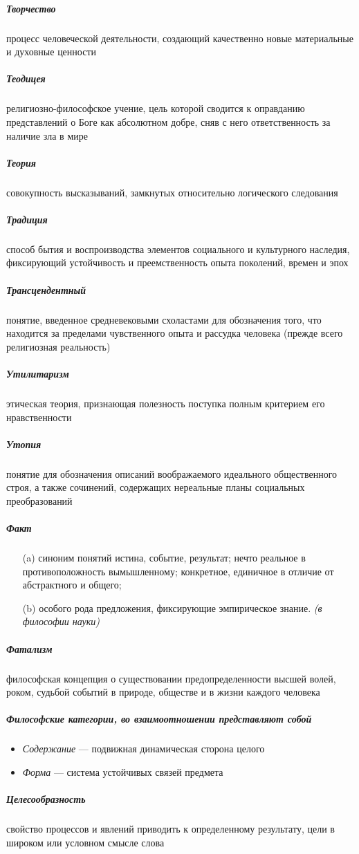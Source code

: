\documentclass[a4paper, 12pt]{article}
\theoremstyle{plain} %
\theoremstyle{definition} %
\theoremstyle{remark} %
\begin{document}
\subparagraph{Творчество}
	процесс человеческой деятельности, создающий качественно новые материальные и духовные ценности

\subparagraph{Теодицея}
	религиозно-философское учение, цель которой сводится к оправданию представлений о Боге как абсолютном добре, сняв с него ответственность за наличие зла в мире

\subparagraph{Теория}
	совокупность высказываний, замкнутых относительно логического следования


\subparagraph{Традиция}
	способ бытия и воспроизводства элементов социального и культурного наследия, фиксирующий устойчивость и преемственность опыта поколений, времен и эпох

\subparagraph{Трансцендентный}
	понятие, введенное средневековыми схоластами для обозначения того, что находится за пределами чувственного опыта и рассудка человека (прежде всего религиозная реальность)

\subparagraph{Утилитаризм}
	этическая теория, признающая полезность поступка полным критерием его нравственности

\subparagraph{Утопия}
	понятие для обозначения описаний воображаемого идеального общественного строя, а также сочинений, содержащих нереальные планы социальных преобразований

\subparagraph{Факт}
\begin{itemize}
	\item[(a)]  синоним понятий истина, событие, результат; нечто реальное в противоположность вымышленному; конкретное, единичное в отличие от абстрактного и общего;
	\item[(b)] особого рода предложения, фиксирующие эмпирическое знание. \emph{(в философии науки)}
\end{itemize}

\subparagraph{Фатализм}
	философская концепция о существовании предопределенности высшей волей, роком, судьбой событий в природе, обществе и в жизни каждого человека

\subparagraph{Философские категории, во взаимоотношении представляют собой}
\begin{itemize}
	\item \emph{Содержание} --- подвижная динамическая сторона целого
	\item \emph{Форма} ---  система устойчивых связей предмета
\end{itemize}

\subparagraph{Целесообразность}
	свойство процессов и явлений приводить к определенному результату, цели в широком или условном смысле слова
\end{document}
